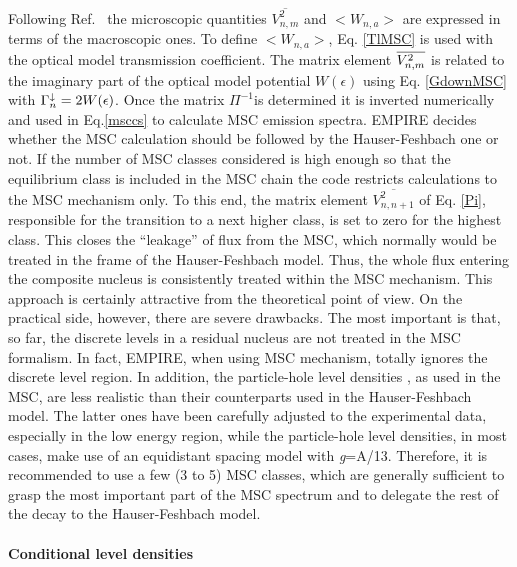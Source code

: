 Following Ref.~\cite{HRW} the microscopic quantities $%
\overline{V_{n,m}^{2}}$ and $<W_{n,a}>$ are expressed in terms of the
macroscopic ones. To define $<W_{n,a}>$, Eq. \ref{TlMSC} is used with  the
optical model transmission coefficient. The matrix element $\overline{%
V_{n,m}^{2}}$ is related to the imaginary part of the optical model
potential $W(\epsilon)$ using Eq. \ref{GdownMSC} with $\Gamma_{n}^{%
\downarrow}=2W(\epsilon)$. Once the matrix $\Pi^{-1}$is determined it is
inverted numerically and used in Eq.\ref{msccs} to calculate MSC%
 emission spectra. EMPIRE decides whether the MSC calculation
should be followed by the Hauser-Feshbach%
 one or not. If the number of MSC classes considered
is high enough so that the equilibrium class is included in the MSC chain
the code restricts calculations to the MSC mechanism only. To this end, the
matrix element $%
\overline{V_{n,n+1}^{2}}$ of Eq. \ref{Pi}, responsible for the transition to
a next higher class, is set to zero for the highest class. This closes the
{}``leakage'' of flux from the MSC, which normally would be treated in the
frame of the Hauser-Feshbach%
 model. Thus, the whole flux entering the composite
nucleus is consistently treated within the MSC mechanism. This approach is
certainly attractive from the theoretical point of view. On the practical
side, however, there are severe drawbacks. The most important is that, so
far, the discrete levels in a residual nucleus are not treated in the MSC%
 formalism. In fact, EMPIRE, when using MSC mechanism, totally
ignores the discrete level region. In addition, the particle-hole level
densities%
, as used in the MSC, are less realistic than their
counterparts used in the Hauser-Feshbach%
 model. The latter ones have been carefully adjusted
to the experimental data, especially in the low energy region, while the
particle-hole level densities, in most cases, make use of an equidistant
spacing model with \emph{g}=A/13. Therefore, it is recommended to use a few
(3 to 5) MSC%
 classes, which are generally sufficient to grasp the most
important part of the MSC spectrum and to delegate the rest of the decay to
the Hauser-Feshbach model.

\paragraph{Conditional level densities}

